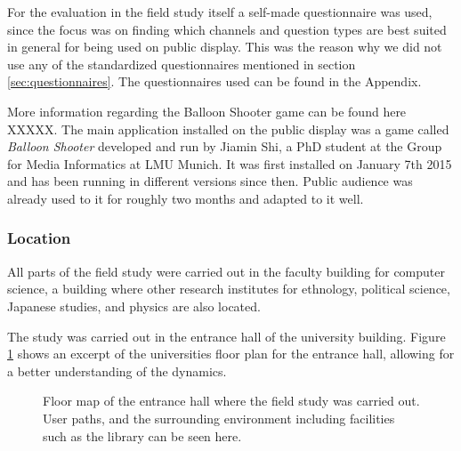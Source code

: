 

		For the evaluation in the field study itself a self-made questionnaire was used, since the focus was on finding which channels and question types are best suited in general for being used on public display. This was the reason why we did not use any of the standardized questionnaires mentioned in section \ref{sec:questionnaires}. The questionnaires used can be found in the Appendix.



		More information regarding the Balloon Shooter game can be found here XXXXX. 
		The main application installed on the public display was a game called \textit{Balloon Shooter} developed and run by Jiamin Shi, a PhD student at the Group for Media Informatics at LMU Munich. It was first installed on January 7th 2015 and has been running in different versions since then. Public audience was already used to it for roughly two months and adapted to it well.




	\subsubsection{Location}

	All parts of the field study were carried out in the faculty building for computer science, a building where other research institutes for ethnology, political science, Japanese studies, and physics are also located.

	The study was carried out in the entrance hall of the university building. Figure \ref{fig:5-entrance-hall} shows an excerpt of the universities floor plan for the entrance hall, allowing for a better understanding of the dynamics.

	\begin{figure}
	    \begin{center}
	    \end{center}
	 \caption{Floor map of the entrance hall where the field study was carried out. User paths, and the surrounding environment including facilities such as the library can be seen here.}
	 \label{fig:5-entrance-hall}
	\end{figure}

